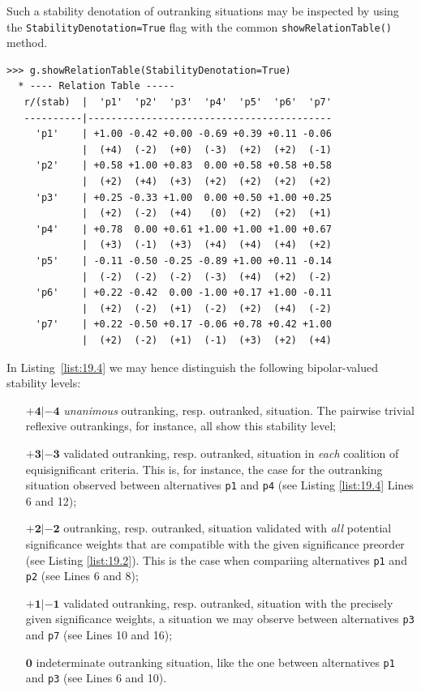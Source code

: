 Such a stability denotation of outranking situations may be inspected by using the \texttt{StabilityDenotation=True} flag  with the common \texttt{showRelationTable()} method.
\begin{lstlisting}[caption={Bipolar-valued outranking relation table with stability denotation},label=list:19.4]
>>> g.showRelationTable(StabilityDenotation=True)
  * ---- Relation Table -----
   r/(stab)  |  'p1'  'p2'  'p3'  'p4'  'p5'  'p6'  'p7'   
   ----------|------------------------------------------
     'p1'    | +1.00 -0.42 +0.00 -0.69 +0.39 +0.11 -0.06  
             |  (+4)  (-2)  (+0)  (-3)  (+2)  (+2)  (-1)  
     'p2'    | +0.58 +1.00 +0.83  0.00 +0.58 +0.58 +0.58  
             |  (+2)  (+4)  (+3)  (+2)  (+2)  (+2)  (+2)  
     'p3'    | +0.25 -0.33 +1.00  0.00 +0.50 +1.00 +0.25  
             |  (+2)  (-2)  (+4)   (0)  (+2)  (+2)  (+1)  
     'p4'    | +0.78  0.00 +0.61 +1.00 +1.00 +1.00 +0.67  
             |  (+3)  (-1)  (+3)  (+4)  (+4)  (+4)  (+2)  
     'p5'    | -0.11 -0.50 -0.25 -0.89 +1.00 +0.11 -0.14  
             |  (-2)  (-2)  (-2)  (-3)  (+4)  (+2)  (-2)  
     'p6'    | +0.22 -0.42  0.00 -1.00 +0.17 +1.00 -0.11
             |  (+2)  (-2)  (+1)  (-2)  (+2)  (+4)  (-2)  
     'p7'    | +0.22 -0.50 +0.17 -0.06 +0.78 +0.42 +1.00  
             |  (+2)  (-2)  (+1)  (-1)  (+3)  (+2)  (+4)  
\end{lstlisting}
In Listing~\ref{list:19.4} we may hence distinguish the following bipolar-valued stability levels:
\begin{itemize}[leftmargin=1.5cm]
\item [$\mathbf{+4 | -4}$] \emph{unanimous} outranking, resp. outranked, situation. The pairwise trivial reflexive outrankings, for instance, all show this stability level;
\item [$\mathbf{+3 | -3}$] validated outranking, resp. outranked, situation in \emph{each} coalition of equisignificant criteria. This is, for instance, the case for the outranking situation observed between alternatives \texttt{p1} and \texttt{p4} (see Listing \ref{list:19.4} Lines 6 and 12);
\item [$\mathbf{+2 | -2}$] outranking, resp. outranked, situation validated with \emph{all} potential significance weights that are compatible with the given significance preorder (see Listing \ref{list:19.2}). This is the case when compariing alternatives \texttt{p1} and \texttt{p2} (see Lines 6 and 8);
\item [$\mathbf{+1 | -1}$] validated outranking, resp. outranked, situation with the precisely given significance weights, a situation we may observe between alternatives \texttt{p3} and \texttt{p7} (see Lines 10 and 16);
\item [$\mathbf{0}$] indeterminate outranking situation, like the one between alternatives \texttt{p1} and \texttt{p3} (see Lines 6 and 10).
\end{itemize}

